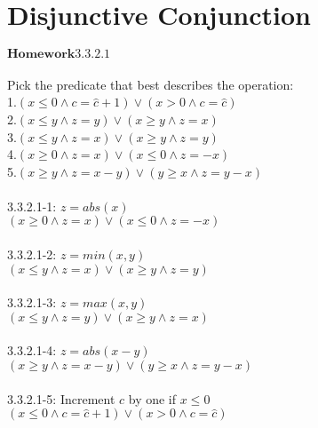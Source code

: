 \documentclass{article}
\author{Krystal Maughan }
\date{May 4th 2017}
\begin{document}
\section{Disjunctive Conjunction}
$\mathbf{Homework 3.3.2.1}$
\\
\\
Pick the predicate that best describes the operation:
\\
1.$ (x \leq 0 \land c = \hat{c} + 1) \vee (x > 0 \land c = \hat{c})$
\\
2.$ (x \leq y \land z = y) \vee (x \geq y \land z = x)$
\\
3.$ (x \leq y \land z = x) \vee (x \geq y \land z = y)$
\\
4.$ (x \geq 0 \land z = x) \vee (x \leq 0 \land z = -x)$
\\
5.$ (x \geq y \land z = x - y) \vee (y \geq x \land z = y - x)$
\\
\\
3.3.2.1-1: $z = abs(x)$
\\
$(x \geq 0 \land z = x) \vee (x \leq 0 \land z = -x)$
\\
\\
3.3.2.1-2: $z = min(x, y)$
\\
$(x \leq y \land z = x) \vee (x \geq y \land z = y)$
\\
\\
3.3.2.1-3: $z = max(x, y)$
\\
$(x \leq y \land z = y) \vee (x \geq y \land z = x)$
\\
\\
3.3.2.1-4: $z = abs(x - y)$
\\
$(x \geq y \land z = x - y) \vee (y \geq x \land z = y - x)$
\\
\\
3.3.2.1-5: Increment $c$ by one if $ x \leq 0$
\\
$(x \leq 0 \land c = \hat{c} + 1) \vee (x > 0 \land c = \hat{c})$
\end{document}
